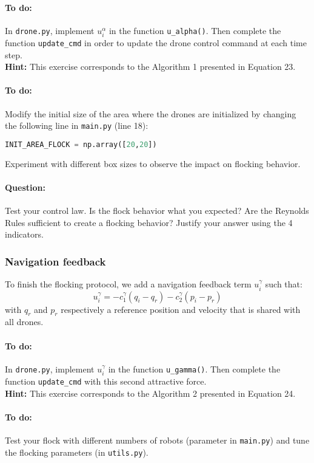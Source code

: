 \documentclass{article}
\begin{document}
\paragraph{To do:}
In \texttt{drone.py}, implement $u_i^\alpha$ in the function \texttt{u\_alpha()}. Then complete the function \texttt{update\_cmd} in order to update the drone control command at each time step.\\
\textbf{Hint:} This exercise corresponds to the Algorithm 1 presented in Equation 23.

\paragraph{To do:} Modify the initial size of the area where the drones are initialized by changing the following line in \texttt{main.py} (line 18):
\begin{lstlisting}[language=python, frame=single]
INIT_AREA_FLOCK = np.array([20,20]) 
\end{lstlisting}
Experiment with different box sizes to observe the impact on flocking behavior.

\paragraph{Question:} Test your control law. Is the flock behavior what you expected? Are the Reynolds Rules sufficient to create a flocking behavior? Justify your answer using the 4 indicators.

\subsubsection{Navigation feedback}
To finish the flocking protocol, we add a navigation feedback term $u_i^\gamma$ such that:
$$
u_i^\gamma = - c_1^{\gamma} (q_i - q_r) - c_2^{\gamma}(p_i - p_r)
$$
with $q_r$ and $p_r$ respectively a reference position and velocity that is shared with all drones.

\paragraph{To do:}
In \texttt{drone.py}, implement $u_i^\gamma$ in the function \texttt{u\_gamma()}. Then complete the function \texttt{update\_cmd} with this second attractive force.\\
\textbf{Hint:} This exercise corresponds to the Algorithm 2 presented in Equation 24.

\paragraph{To do:} Test your flock with different numbers of robots (parameter in \texttt{main.py}) and tune the flocking parameters (in \texttt{utils.py}).
\end{document}
